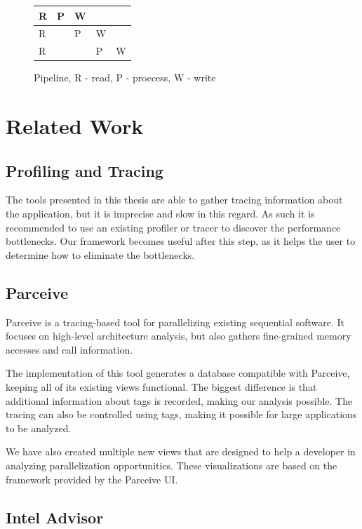 \begin{figure}[!ht]
	\centering
	\begin{tabular}{ l | l | l | l | l}
		R & P & W & & \\
		\hline
		R &  & P & W & \\
		\hline
		R &  & & P & W \\
	\end{tabular}
	\caption{Pipeline, R - read, P - proecess, W - write}
	\label{cap1:pipeline}
\end{figure}

\section {Related Work}

\subsection{Profiling and Tracing}

The tools presented in this thesis are able to gather tracing information about the application, but it is imprecise and slow in this regard. As such it is recommended to use an existing profiler or tracer to discover the performance bottlenecks. Our framework becomes useful after this step, as it helps the user to determine how to eliminate the bottlenecks.

\subsection{Parceive}

Parceive \cite{parceive} is a tracing-based tool for parallelizing existing sequential software. It focuses on high-level architecture analysis, but also gathers fine-grained memory accesses and call information.

The implementation of this tool generates a database compatible with Parceive, keeping all of its existing views functional. The biggest difference is that additional information about tags is recorded, making our analysis possible. The tracing can also be controlled using tags, making it possible for large applications to be analyzed.

We have also created multiple new views that are designed to help a developer in analyzing parallelization opportunities. These visualizations are based on the framework provided by the Parceive UI.

\subsection{Intel Advisor}

